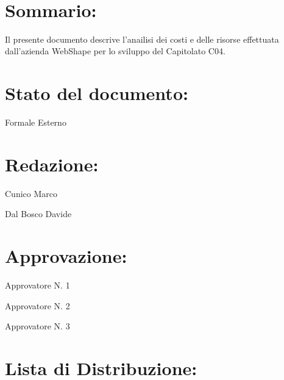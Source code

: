 \newpage

\begin{center} %
	\begin{Huge}	
				\textbf{\TITOLODOC}
			\\
	\end{Huge}
\end{center}

\section*{\Large Sommario:}
Il presente documento descrive l'anailisi dei costi e delle risorse effettuata dall'azienda WebShape per lo sviluppo del Capitolato C04.

\indent \indent

\section*{\Large Stato del documento:}
\indent \indent
	Formale Esterno

\section*{\Large Redazione:}
	\begin{elencopuntato}[\normindent]
		\item Cunico Marco
		\item Dal Bosco Davide
	\end{elencopuntato}

\section*{\Large Approvazione:}
	\begin{elencopuntato}[\normindent]
		\item Approvatore N. 1
		\item Approvatore N. 2
		\item Approvatore N. 3
	\end{elencopuntato}

\section*{\LARGE Lista di Distribuzione:}

